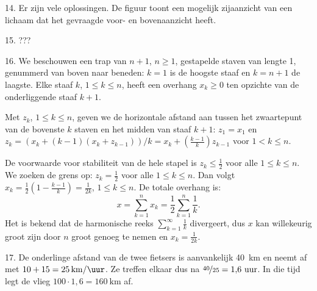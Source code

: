 \clearpage

\begin{problem}{14.}
    Er zijn vele oplossingen. De figuur toont een mogelijk zijaanzicht van een lichaam dat het gevraagde voor- en bovenaanzicht heeft.\\

    \hspace{3cm}
\end{problem}

\begin{problem}{15.}
    ???
\end{problem}

\begin{problem}{16.}
    We beschouwen een trap van $n+1$, $n \geq 1$, gestapelde staven van lengte 1, genummerd van boven naar beneden: $k = 1$ is de hoogste staaf en $k = n+1$ de laagste. Elke staaf $k$, $1 \leq k \leq n$, heeft een overhang $x_k \geq 0$ ten opzichte van de onderliggende staaf $k+1$.

    Met $z_k$, $1 \leq k \leq n$, geven we de horizontale afstand aan tussen het zwaartepunt van de bovenste $k$ staven en het midden van staaf $k+1$: $z_1 = x_1$ en $z_k = (x_k + (k - 1) (x_k + z_{k-1})) / k = x_k + \left( \frac{k-1}{k} \right) z_{k-1}$ voor $1 < k \leq n$.

    De voorwaarde voor stabiliteit van de hele stapel is $z_k \leq \frac{1}{2}$ voor alle $1 \leq k \leq n$. We zoeken de grens op: $z_k = \frac{1}{2}$ voor alle $1 \leq k \leq n$. Dan volgt $x_k = \frac{1}{2} \left( 1 - \frac{k-1}{k} \right) = \frac{1}{2 k}$, $1 \leq k \leq n$. De totale overhang is:
    \begin{equation*}
        x = \textstyle\sum\limits_{k=1}^{n} x_k = \frac{1}{2} \textstyle\sum\limits_{k=1}^{n} \frac{1}{k}.
    \end{equation*}
    Het is bekend dat de harmonische reeks $\sum\limits_{k=1}^{\infty} \frac{1}{k}$ divergeert, dus $x$ kan willekeurig groot zijn door $n$ groot genoeg te nemen en $x_k = \frac{1}{2 k}$.
\end{problem}

\begin{problem}{17.}
    De onderlinge afstand van de twee fietsers is aanvankelijk \SI{40}{\km} en neemt af met $10 + 15 = \SI{25}{\km\per\uur}$. Ze treffen elkaar dus na $\nicefrac{40}{25} = 1{,}6 \text{ uur}$. In die tijd legt de vlieg $100 \cdot 1{,}6 = \SI{160}{\km}$ af.
\end{problem}


